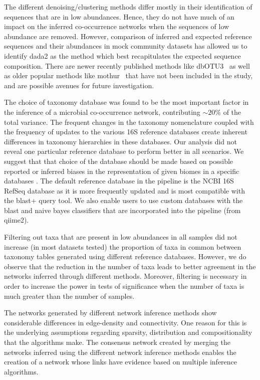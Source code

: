 The different denoising/clustering methods differ mostly in their identification of sequences that are in low abundances.
Hence, they do not have much of an impact on the inferred co-occurrence networks when the sequences of low abundance are removed.
However, comparison of inferred and expected reference sequences and their abundances in mock community datasets has allowed us to identify \ac{dada2} as the method which best recapitulates the expected sequence composition.
There are newer recently published methods like dbOTU3~\cite{Olesen2017} as well as older popular methods like mothur~\cite{Schloss2009} that have not been included in the study, and are possible avenues for future investigation.

The choice of taxonomy database was found to be the most important factor in the inference of a microbial co-occurrence network, contributing $\sim20\%$ of the total variance.
The frequent changes in the taxonomy nomenclature coupled with the frequency of updates to the various 16S reference databases create inherent differences \cite{Balvociute2017} in taxonomy hierarchies in these databases.
Our analysis did not reveal one particular reference database to perform better in all scenarios. We suggest that that choice of the database should be made based on possible reported or inferred biases in the representation of given biomes in a specific databases \cite{Balvociute2017}.
The default reference database in the pipeline is the NCBI 16S RefSeq database as it is more frequently updated and is most compatible with the blast+ query tool.
We also enable users to use custom databases \cite{Griffen2011,Ritari2015} with the blast and naive bayes classifiers that are incorporated into the pipeline (from \ac{qiime2}).

Filtering out taxa that are present in low abundances in all samples did not increase (in most datasets tested) the proportion of taxa in common between taxonomy tables generated using different reference databases.
However, we do observe that the reduction in the number of taxa leads to better agreement in the networks inferred through different methods.
Moreover, filtering is necessary in order to increase the power in tests of significance when the number of taxa is much greater than the number of samples.

The networks generated by different network inference methods show considerable differences in edge-density and connectivity.
One reason for this is the underlying assumptions regarding sparsity, distribution and compositionality that the algorithms make.
The consensus network created by merging the networks inferred using the different network inference methods enables the creation of a network whose links have evidence based on multiple inference algorithms.

